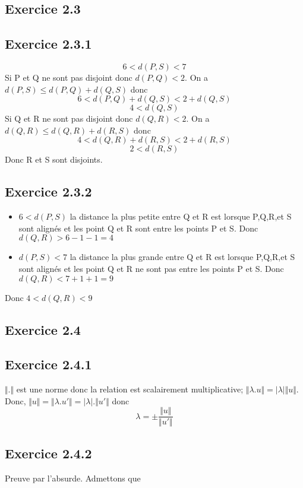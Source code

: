 \documentclass[]{book}
\theoremstyle{definition}
\begin{document}
\subsection*{Exercice 2.3}
\subsection*{Exercice 2.3.1}
$$6<d(P,S)<7$$
Si P et Q ne sont pas disjoint donc $d(P,Q)<2$. On a $d(P,S) \leq d(P,Q)+d(Q,S)$ donc
$$6<d(P,Q)+d(Q,S)<2+d(Q,S)$$
$$4<d(Q,S)$$
Si Q et R ne sont pas disjoint donc $d(Q,R)<2$. On a $d(Q,R) \leq d(Q,R)+d(R,S)$ donc
$$4<d(Q,R)+d(R,S)<2+d(R,S)$$
$$2<d(R,S)$$
Donc R et S sont disjoints.

\subsection*{Exercice 2.3.2}
\begin{itemize}
\item $6 < d(P,S)$ la distance la plus petite entre Q et R est lorsque P,Q,R,et S sont align\'es et les point Q et R sont entre les points P et S. Donc $d(Q,R) > 6-1-1 = 4$
\item $d(P,S)<7$ la distance la plus grande entre Q et R est lorsque P,Q,R,et S sont align\'es et les point Q et R ne sont pas entre les points P et S. Donc $d(Q,R) < 7+1+1 = 9$
\end{itemize}
Donc $4<d(Q,R)<9$


\subsection*{Exercice 2.4}
\subsection*{Exercice 2.4.1}
$\Vert . \Vert$ est une norme donc la relation est scalairement multiplicative; $\Vert \lambda.u\Vert = |\lambda|\Vert u\Vert$. Donc, $\Vert u \Vert = \Vert \lambda.u'\Vert = |\lambda| . \Vert u'\Vert$ donc 
$$\lambda = \pm \frac{\Vert u\Vert}{\Vert u'\Vert}$$

\subsection*{Exercice 2.4.2}
Preuve par l'absurde. Admettons que 
\end{document}
